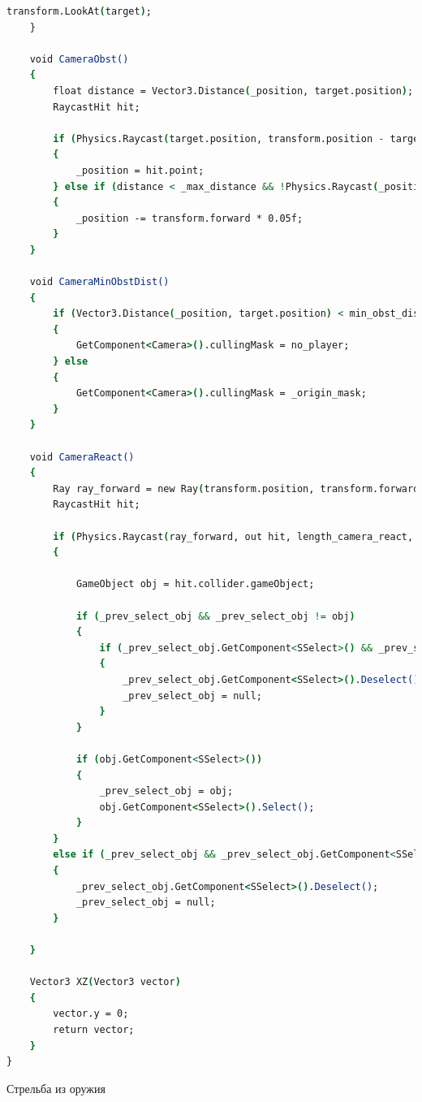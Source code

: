 \begin{lstlisting}[language=csh]
        transform.LookAt(target);
    }

    void CameraObst()
    {
        float distance = Vector3.Distance(_position, target.position);
        RaycastHit hit;

        if (Physics.Raycast(target.position, transform.position - target.position, out hit, _max_distance - _min_distance, obstacles))
        {
            _position = hit.point;
        } else if (distance < _max_distance && !Physics.Raycast(_position, -transform.forward, 0.1f, obstacles))
        {
            _position -= transform.forward * 0.05f;
        }
    }

    void CameraMinObstDist()
    {
        if (Vector3.Distance(_position, target.position) < min_obst_dist)
        {
            GetComponent<Camera>().cullingMask = no_player;
        } else
        {
            GetComponent<Camera>().cullingMask = _origin_mask;
        }
    }

    void CameraReact()
    {
        Ray ray_forward = new Ray(transform.position, transform.forward.normalized);
        RaycastHit hit;

        if (Physics.Raycast(ray_forward, out hit, length_camera_react, active) && (XZ(target.position) - XZ(hit.point)).magnitude < length_player_react)
        {

            GameObject obj = hit.collider.gameObject;

            if (_prev_select_obj && _prev_select_obj != obj)
            {
                if (_prev_select_obj.GetComponent<SSelect>() && _prev_select_obj.GetComponent<SSelect>().true_select)
                {
                    _prev_select_obj.GetComponent<SSelect>().Deselect();
                    _prev_select_obj = null;
                }
            }

            if (obj.GetComponent<SSelect>())
            {
                _prev_select_obj = obj;
                obj.GetComponent<SSelect>().Select();
            }
        }
        else if (_prev_select_obj && _prev_select_obj.GetComponent<SSelect>() && _prev_select_obj.GetComponent<SSelect>().true_select)
        {
            _prev_select_obj.GetComponent<SSelect>().Deselect();
            _prev_select_obj = null;
        }

    }

    Vector3 XZ(Vector3 vector)
    {
        vector.y = 0;
        return vector;
    }
}
\end{lstlisting}

 Стрельба из оружия

